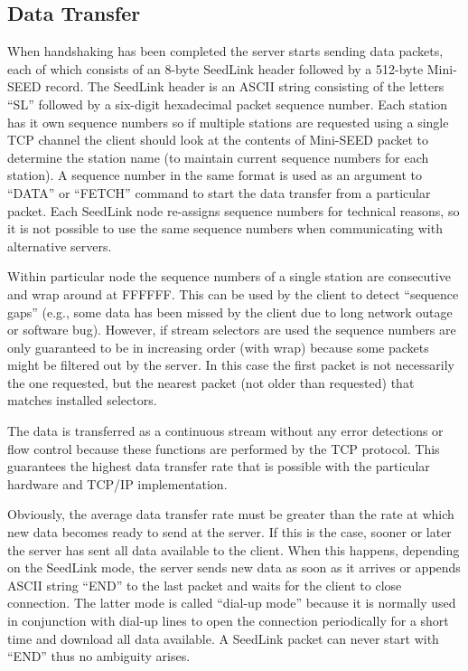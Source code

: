 \documentclass[11pt,a4paper,titlepage]{article}
\begin{document}
\subsection{Data Transfer}

When handshaking has been completed the server starts sending data
packets, each of which consists of an 8-byte SeedLink header followed
by a 512-byte Mini-SEED record. The SeedLink header is an ASCII string
consisting of the letters ``SL'' followed by a six-digit hexadecimal
packet sequence number. Each station has it own sequence numbers so if
multiple stations are requested using a single TCP channel the client
should look at the contents of Mini-SEED packet to determine the
station name (to maintain current sequence numbers for each
station). A sequence number in the same format is used as an argument
to ``DATA'' or ``FETCH'' command to start the data transfer from a
particular packet. Each SeedLink node re-assigns sequence numbers for
technical reasons, so it is not possible to use the same sequence
numbers when communicating with alternative servers.

Within particular node the sequence numbers of a single station are
consecutive and wrap around at FFFFFF. This can be used by the client
to detect ``sequence gaps'' (e.g., some data has been missed by the
client due to long network outage or software bug). However, if stream
selectors are used the sequence numbers are only guaranteed to be in
increasing order (with wrap) because some packets might be filtered
out by the server. In this case the first packet is not necessarily
the one requested, but the nearest packet (not older than requested)
that matches installed selectors.

The data is transferred as a continuous stream without any error
detections or flow control because these functions are performed by
the TCP protocol. This guarantees the highest data transfer rate that
is possible with the particular hardware and TCP/IP implementation.

Obviously, the average data transfer rate must be greater than the
rate at which new data becomes ready to send at the server. If this is
the case, sooner or later the server has sent all data available to
the client. When this happens, depending on the SeedLink mode, the
server sends new data as soon as it arrives or appends ASCII string
``END'' to the last packet and waits for the client to close
connection. The latter mode is called ``dial-up mode'' because it is
normally used in conjunction with dial-up lines to open the connection
periodically for a short time and download all data available. A
SeedLink packet can never start with ``END'' thus no ambiguity
arises.
\end{document}
